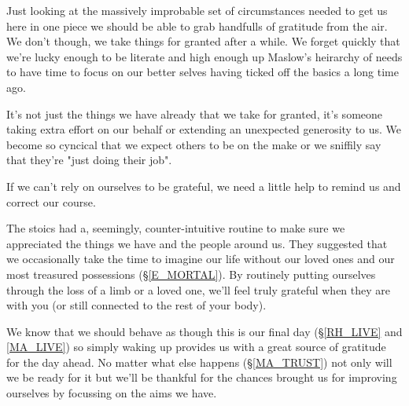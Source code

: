\cleartorightpage
{\small

Just looking at the massively improbable set of circumstances needed to get us here in one piece we should be able to grab handfulls of gratitude from the air. We don't though, we take things for granted after a while. We forget quickly that we're lucky enough to be literate and high enough up Maslow's heirarchy of needs to have time to focus on our better selves having ticked off the basics a long time ago. 

It's not just the things we have already that we take for granted, it's someone taking extra effort on our behalf or extending an unexpected generosity to us. We become so cyncical that we expect others to be on the make or we sniffily say that they're "just doing their job".

If we can't rely on ourselves to be  grateful, we need a little help to remind us and correct our course.

The stoics had a, seemingly, counter-intuitive routine to make sure we appreciated the things we have and the people around us. They suggested that we occasionally take the time to imagine our life without our loved ones and our most treasured possessions (\S \ref{E_MORTAL}). By routinely putting ourselves through the loss of a limb or a loved one, we'll feel truly grateful when they are with you (or still connected to the rest of your body).

We know that we should behave as though this is our final day (\S \ref{RH_LIVE} and \ref{MA_LIVE}) so simply waking up provides us with a great source of gratitude for the day ahead. No matter what else happens (\S \ref{MA_TRUST}) not only will we be ready for it but we'll be thankful for the chances brought us for improving ourselves by focussing on the aims we have.

}
